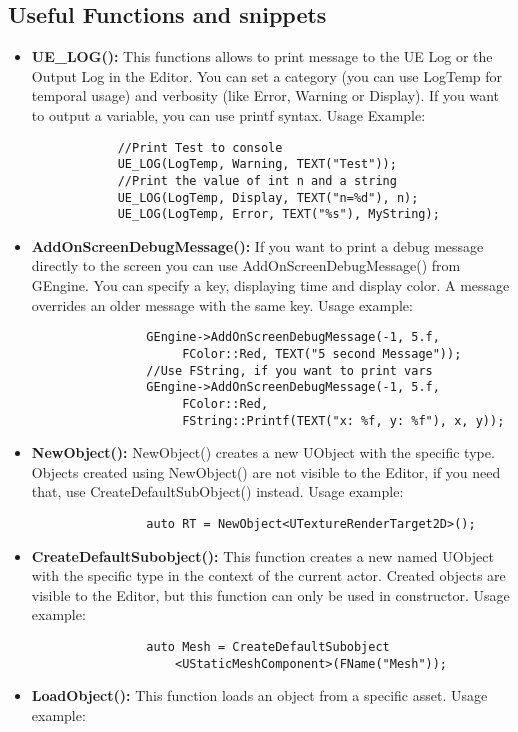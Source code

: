\documentclass[10pt]{article}
\begin{document}
\begin{multicols*}{5}
	\subsection{Useful Functions and snippets}
	\begin{itemize}
			\item \textbf{UE\_LOG():} This functions allows to print message to the UE Log or the Output Log in the Editor. You can set a category (you can use LogTemp for temporal usage) and verbosity (like Error, Warning or Display). If you want to output a variable, you can use printf syntax.  Usage Example:
			\begin{verbatim}
			//Print Test to console
			UE_LOG(LogTemp, Warning, TEXT("Test"));
			//Print the value of int n and a string
			UE_LOG(LogTemp, Display, TEXT("n=%d"), n);
			UE_LOG(LogTemp, Error, TEXT("%s"), MyString);
			\end{verbatim}
			\item \textbf{AddOnScreenDebugMessage():} If you want to print a debug message directly to the screen you can use AddOnScreenDebugMessage() from GEngine. You can specify a key, displaying time and display color. A message overrides an older message with the same key. Usage example:
			\begin{verbatim}
				GEngine->AddOnScreenDebugMessage(-1, 5.f, 
				     FColor::Red, TEXT("5 second Message"));
				//Use FString, if you want to print vars
				GEngine->AddOnScreenDebugMessage(-1, 5.f, 
				     FColor::Red, 
				     FString::Printf(TEXT("x: %f, y: %f"), x, y));
			\end{verbatim}
			\item \textbf{NewObject():} NewObject() creates a new UObject with the specific type. Objects created using NewObject() are not visible to the Editor, if you need that, use CreateDefaultSubObject() instead. Usage example:
			\begin{verbatim}
				auto RT = NewObject<UTextureRenderTarget2D>();
			\end{verbatim}
			\item \textbf{CreateDefaultSubobject():} This function creates a new named UObject with the specific type in the context of the current actor. Created objects are visible to the Editor, but this function can only be used in constructor. Usage example:
			\begin{verbatim}
				auto Mesh = CreateDefaultSubobject
				    <UStaticMeshComponent>(FName("Mesh"));
			\end{verbatim}
			\item \textbf{LoadObject():} This function loads an object from a specific asset. Usage example:

\end{itemize}
\end{multicols*}
\end{document}
